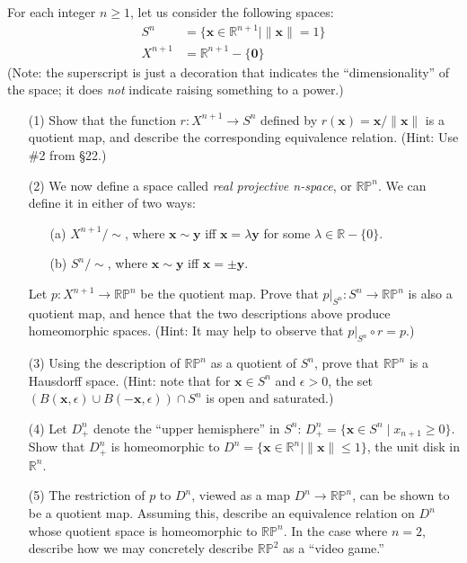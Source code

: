   \begin{exercise}
    For each integer $n \geq 1$, let us consider the following spaces:
    \begin{align*}
      S^n &= \{\mathbf{x} \in \mathbb{R}^{n+1} \mid \|\mathbf{x}\|= 1\} \\
      X^{n+1} &= \mathbb{R}^{n+1} - \{\mathbf{0}\}
    \end{align*}
    (Note: the superscript is just a decoration that indicates the ``dimensionality''
    of the space; it does \textit{not} indicate raising something to a power.)
    \begin{enumerate}
      \item[(1)] Show that the function $r : X^{n+1} \to S^n$ defined by $r(\mathbf{x}) = \mathbf{x}/\|\mathbf{x}\|$ is a
        quotient map, and describe the corresponding equivalence relation. (Hint:
        Use \#2 from \S22.)
        
      \item[(2)] We now define a space called \textit{real projective n-space}, or $\mathbb{RP}^n$. We can
        define it in either of two ways:
        \begin{enumerate}
          \item[(a)] $X^{n+1}/{\sim}$, where $\mathbf{x} \sim \mathbf{y}$ iff $\mathbf{x} = \lambda\mathbf{y}$ for some $\lambda \in \mathbb{R} - \{0\}$.
          \item[(b)] $S^n/{\sim}$, where $\mathbf{x} \sim \mathbf{y}$ iff $\mathbf{x} = \pm\mathbf{y}$.
        \end{enumerate}
        Let $p : X^{n+1} \to \mathbb{RP}^n$ be the quotient map. Prove that $p|_{S^n} : S^n \to \mathbb{RP}^n$ is
        also a quotient map, and hence that the two descriptions above produce
        homeomorphic spaces. (Hint: It may help to observe that $p|_{S^n} \circ r = p$.)
        
      \item[(3)] Using the description of $\mathbb{RP}^n$ as a quotient of $S^n$, prove that $\mathbb{RP}^n$ is
        a Hausdorff space. (Hint: note that for $\mathbf{x} \in S^n$ and $\epsilon > 0$, the set
        $(B(\mathbf{x},\epsilon) \cup B(-\mathbf{x},\epsilon)) \cap S^n$ is open and saturated.)
        
      \item[(4)] Let $D^n_+$ denote the ``upper hemisphere'' in $S^n$: $D^n_+ = \{\mathbf{x} \in S^n \mid x_{n+1} \geq 0\}$.
        Show that $D^n_+$ is homeomorphic to $D^n = \{\mathbf{x} \in \mathbb{R}^n \mid \|\mathbf{x}\| \leq 1\}$, the unit
        disk in $\mathbb{R}^n$.
        
      \item[(5)] The restriction of $p$ to $D^n$, viewed as a map $D^n \to \mathbb{RP}^n$, can be shown
        to be a quotient map. Assuming this, describe an equivalence relation
        on $D^n$ whose quotient space is homeomorphic to $\mathbb{RP}^n$. In the case where
        $n = 2$, describe how we may concretely describe $\mathbb{RP}^2$ as a ``video game.''
    \end{enumerate}
  \end{exercise}
